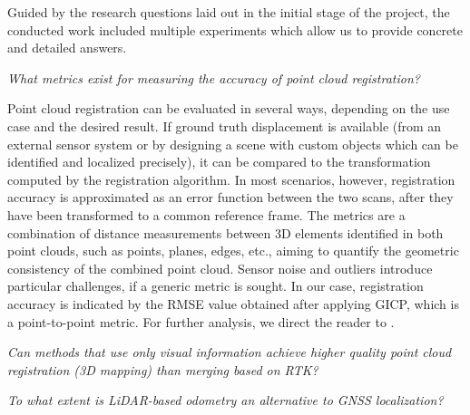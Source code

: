 Guided by the research questions laid out in the initial stage of the project, the conducted work included multiple experiments which allow us to provide concrete and detailed answers.
\begin{compactenum}
    \item \textit{What metrics exist for measuring the accuracy of point cloud registration?}

    Point cloud registration can be evaluated in several ways, depending on the use case and the desired result. If ground truth displacement is available (\eg from an external sensor system or by designing a scene with custom objects which can be identified and localized precisely), it can be compared to the transformation computed by the registration algorithm.
    In most scenarios, however, registration accuracy is approximated as an error function between the two scans, after they have been transformed to a common reference frame. The metrics are a combination of distance measurements between 3D elements identified in both point clouds, such as points, planes, edges, etc., aiming to quantify the geometric consistency of the combined point cloud. Sensor noise and outliers introduce particular challenges, if a generic metric is sought. In our case, registration accuracy is indicated by the RMSE value obtained after applying GICP, which is a point-to-point metric. For further analysis, we direct the reader to \cite{adolfsson2021coral}.

    \item \textit{Can methods that use only visual information achieve higher quality point cloud registration (3D mapping) than merging based on RTK?}

    \item \textit{To what extent is LiDAR-based odometry an alternative to GNSS localization?}

\end{compactenum}


